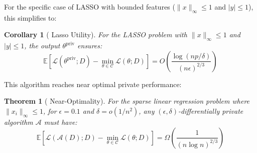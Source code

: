 \documentclass[12pt,letterpaper]{article}
\newtheorem{theorem}{Theorem}[section]
\newtheorem{corollary}{Corollary}[theorem]
\begin{document}
For the specific case of LASSO with bounded features ($\|x\|_{\infty} \leq 1$ and $|y| \leq 1$), this simplifies to:

\begin{corollary}[\cite{NIPS2015_52d080a3} Lasso Utility]
    \label{thm:utilcor}
    For the LASSO problem with $\|x\|_{\infty} \leq 1$ and $|y| \leq 1$, the output $\theta^{\text{priv}}$ ensures:
    \[
    \mathbb{E}[\mathcal{L}(\theta^{\text{priv}}; D) - \min_{\theta \in \mathcal{C}}\mathcal{L}(\theta; D)] = O\left(\frac{\log(np/\delta)}{(n\epsilon)^{2/3}}\right)
    \]
\end{corollary}

This algorithm reaches near optimal private performance: 

\begin{theorem}[\cite{NIPS2015_52d080a3} Near-Optimality]
    \label{thm:NearOpt}
    For the sparse linear regression problem where $\|x_i\|_{\infty} \leq 1$, for $\epsilon = 0.1$ and $\delta = o(1/n^2)$, any $(\epsilon, \delta)$-differentially private algorithm $\mathcal{A}$ must have:
    \[
    \mathbb{E}[\mathcal{L}(\mathcal{A}(D); D) - \min_{\theta \in \mathcal{C}}\mathcal{L}(\theta; D)] = \Omega\left(\frac{1}{(n\log n)^{2/3}}\right)
    \]
\end{theorem}
\end{document}

